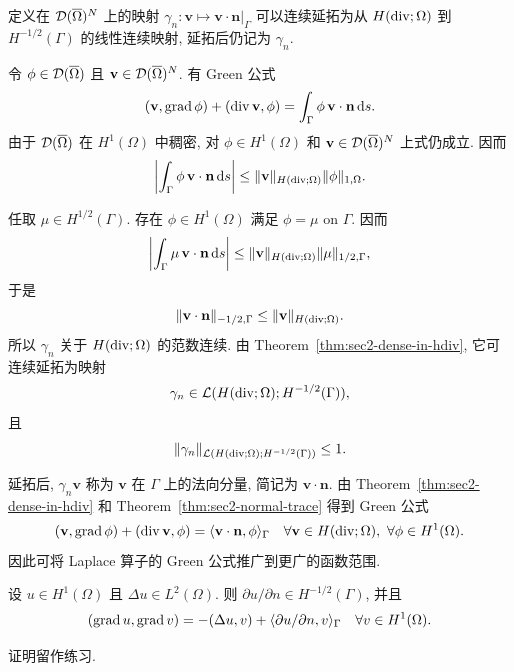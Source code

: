\setcounter{statement}{4}
\begin{Theorem}\label{thm:sec2-normal-trace}
定义在 $\mathcal{D}(\overline\Omega)^N$ 上的映射
$\gamma_n:\mathbf v\mapsto\mathbf v\cdot\mathbf n|_\Gamma$ 可以连续延拓为从
$H(\operatorname{div};\Omega)$ 到 $H^{-1/2}(\Gamma)$ 的线性连续映射, 延拓后仍记为 $\gamma_n$.
\end{Theorem}
\begin{Proof}
令 $\phi\in\mathcal{D}(\overline\Omega)$ 且 $\mathbf v\in\mathcal{D}(\overline\Omega)^N$. 有 Green 公式
\[
  (\mathbf v,\operatorname{grad}\phi)+(\operatorname{div}\mathbf v,\phi)
  =\int_\Gamma\phi\,\mathbf v\cdot\mathbf n\,\mathrm{d} s.
\]
由于 $\mathcal{D}(\overline\Omega)$ 在 $H^1(\Omega)$ 中稠密, 对
$\phi\in H^1(\Omega)$ 和 $\mathbf v\in\mathcal{D}(\overline\Omega)^N$ 上式仍成立. 因而
\[
  \left|\int_\Gamma\phi\,\mathbf v\cdot\mathbf n\,\mathrm{d} s\right|
  \le\|\mathbf v\|_{H(\operatorname{div};\Omega)}\|\phi\|_{1,\Omega}.
\]

任取 $\mu\in H^{1/2}(\Gamma)$. 存在 $\phi\in H^1(\Omega)$ 满足
$\phi=\mu$ on $\Gamma$. 因而
\[
  \left|\int_\Gamma\mu\,\mathbf v\cdot\mathbf n\,\mathrm{d} s\right|
  \le\|\mathbf v\|_{H(\operatorname{div};\Omega)}\|\mu\|_{1/2,\Gamma},
\]
于是
\[
  \|\mathbf v\cdot\mathbf n\|_{-1/2,\Gamma}
  \le\|\mathbf v\|_{H(\operatorname{div};\Omega)}.
\]
所以 $\gamma_n$ 关于 $H(\operatorname{div};\Omega)$ 的范数连续. 由
Theorem~\ref{thm:sec2-dense-in-hdiv}, 它可连续延拓为映射
\[
  \gamma_n\in\mathcal{L}(H(\operatorname{div};\Omega);H^{-1/2}(\Gamma)),
\]
且
\begin{equation}\label{eq:sec2-normal-trace-norm}
  \|\gamma_n\|_{\mathcal{L}(H(\operatorname{div};\Omega);H^{-1/2}(\Gamma))}\le1.
\end{equation}
\end{Proof}

延拓后, $\gamma_n\mathbf v$ 称为 $\mathbf v$ 在 $\Gamma$ 上的法向分量, 简记为
$\mathbf v\cdot\mathbf n$. 由 Theorem~\ref{thm:sec2-dense-in-hdiv} 和
Theorem~\ref{thm:sec2-normal-trace} 得到 Green 公式
\begin{equation}\label{eq:sec2-hdiv-green}
  (\mathbf v,\operatorname{grad}\phi)+(\operatorname{div}\mathbf v,\phi)
  =\langle\mathbf v\cdot\mathbf n,\phi\rangle_\Gamma
  \quad\forall\mathbf v\in H(\operatorname{div};\Omega),\ \forall\phi\in H^1(\Omega).
\end{equation}
因此可将 Laplace 算子的 Green 公式推广到更广的函数范围.

\setcounter{statement}{5}
\begin{Corollary}\label{cor:sec2-laplace-green}
设 $u\in H^1(\Omega)$ 且 $\Delta u\in L^2(\Omega)$. 则
$\partial u/\partial n\in H^{-1/2}(\Gamma)$, 并且
\begin{equation}\label{eq:sec2-laplace-green}
  (\operatorname{grad} u,\operatorname{grad} v)=-(\Delta u,v)
  +\langle\partial u/\partial n,v\rangle_\Gamma
  \quad\forall v\in H^1(\Omega).
\end{equation}
\end{Corollary}
证明留作练习.

